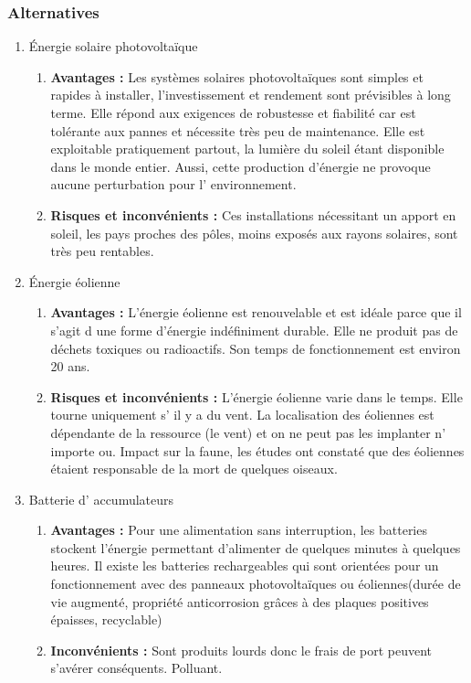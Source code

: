 \subsubsection{Alternatives}
\begin{enumerate}
\item Énergie solaire photovolta\"ique
\begin{enumerate}
\item \textbf{Avantages :}
Les syst\`emes solaires photovoltaïques sont simples et rapides à installer, l'investissement  et rendement sont pr\'{e}visibles à long terme.
Elle r\'{e}pond aux exigences de robustesse et fiabilit\'{e} car est tolérante aux pannes et n\'{e}cessite tr\`es peu de maintenance. 
Elle est exploitable pratiquement partout, la lumi\`ere du soleil \'{e}tant disponible dans le monde entier. 
Aussi, cette production d'\'{e}nergie ne provoque aucune perturbation pour l' environnement.

\item \textbf{Risques et inconv\'enients :}
Ces installations n\'{e}cessitant un apport en soleil, les pays proches des pôles, moins expos\'{e}s aux rayons solaires, sont tr\`es peu rentables.
\end{enumerate}

\item Énergie \'{e}olienne
\begin{enumerate}
\item \textbf{Avantages :}
L'\'{e}nergie \'{e}olienne est renouvelable et est id\'{e}ale parce que il s'agit d une forme d'\'{e}nergie ind\'{e}finiment durable.
Elle ne produit pas de d\'{e}chets toxiques ou radioactifs. 
Son temps de fonctionnement est environ 20 ans.

\item \textbf{Risques et inconv\'enients :}
L'\'{e}nergie \'{e}olienne varie dans le temps.  Elle tourne uniquement s' il y a du vent.
La localisation des \'{e}oliennes est d\'{e}pendante de la ressource (le vent) et on ne peut pas les implanter n' importe ou. 
Impact sur la faune, les \'{e}tudes ont constat\'{e} que des \'{e}oliennes \'{e}taient responsable de la mort de quelques oiseaux.
\end{enumerate}


\item Batterie d' accumulateurs
\begin{enumerate}
\item \textbf{Avantages :}
Pour une alimentation sans interruption, les batteries stockent l'énergie permettant d'alimenter de quelques minutes à quelques heures.
Il existe les batteries rechargeables qui sont orient\'{e}es pour un fonctionnement avec des panneaux photovoltaïques ou  \'{e}oliennes(dur\'{e}e de vie augment\'{e}, propriét\'{e} anticorrosion grâces à des plaques positives \'{e}paisses, recyclable)

\item \textbf{Inconv\'{e}nients :}
Sont produits lourds donc le frais de port peuvent s'av\'{e}rer cons\'{e}quents.
Polluant.

\end{enumerate}
\end{enumerate}


